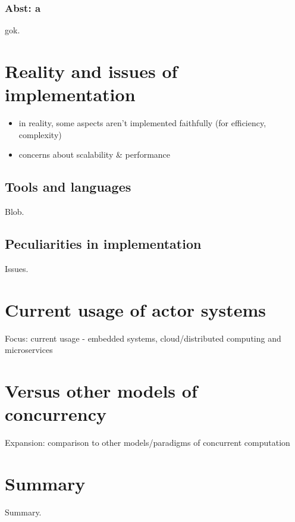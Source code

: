 \documentclass[A4]{article}
\begin{document}
\subsubsection{Abst: a}
gok.

\section{Reality and issues of implementation}
\begin{itemize}
\item in reality, some aspects aren't implemented faithfully (for efficiency, complexity)
\item concerns about scalability \& performance
\end{itemize}
\subsection{Tools and languages}
Blob.

\subsection{Peculiarities in implementation}
Issues.

\section{Current usage of actor systems}
Focus: current usage - embedded systems, cloud/distributed computing and microservices

\section{Versus other models of concurrency}
Expansion: comparison to other models/paradigms of concurrent computation

\section{Summary}
\label{summary}
Summary.

\nocite{robotron,
stonx,vice,650sim,herculessim,zib,4004,thermal1,thermal2,rojas}




\end{document}
